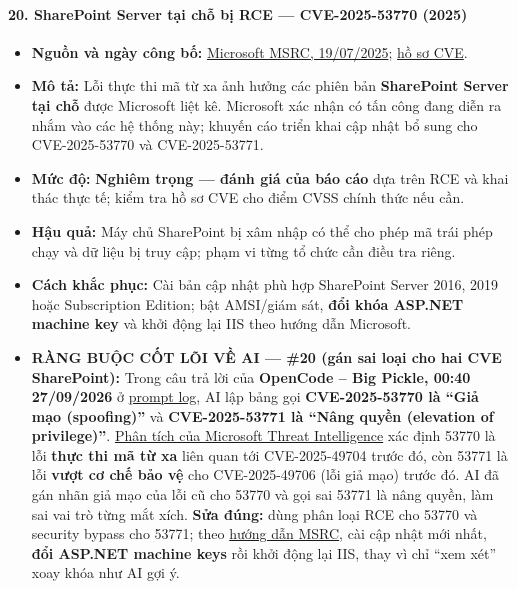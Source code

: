 \paragraph{20. SharePoint Server tại chỗ bị RCE --- CVE-2025-53770 (2025)}\label{sharepoint-server-tux1ea1i-chux1ed7-bux1ecb-rce-cve-2025-53770-2025}

\begin{itemize}
\tightlist
\item
  \textbf{Nguồn và ngày công bố:} \href{https://www.microsoft.com/en-us/msrc/blog/2025/07/customer-guidance-for-sharepoint-vulnerability-cve-2025-53770}{Microsoft MSRC, 19/07/2025}; \href{https://msrc.microsoft.com/update-guide/vulnerability/CVE-2025-53770}{hồ sơ CVE}.
\item
  \textbf{Mô tả:} Lỗi thực thi mã từ xa ảnh hưởng các phiên bản \textbf{SharePoint Server tại chỗ} được Microsoft liệt kê. Microsoft xác nhận có tấn công đang diễn ra nhắm vào các hệ thống này; khuyến cáo triển khai cập nhật bổ sung cho CVE-2025-53770 và CVE-2025-53771.
\item
  \textbf{Mức độ:} \textbf{Nghiêm trọng --- đánh giá của báo cáo} dựa trên RCE và khai thác thực tế; kiểm tra hồ sơ CVE cho điểm CVSS chính thức nếu cần.
\item
  \textbf{Hậu quả:} Máy chủ SharePoint bị xâm nhập có thể cho phép mã trái phép chạy và dữ liệu bị truy cập; phạm vi từng tổ chức cần điều tra riêng.
\item
  \textbf{Cách khắc phục:} Cài bản cập nhật phù hợp SharePoint Server 2016, 2019 hoặc Subscription Edition; bật AMSI/giám sát, \textbf{đổi khóa ASP.NET machine key} và khởi động lại IIS theo hướng dẫn Microsoft.
\item
  \textbf{RÀNG BUỘC CỐT LÕI VỀ AI --- \#20 (gán sai loại cho hai CVE SharePoint):} Trong câu trả lời của \textbf{OpenCode -- Big Pickle, 00:40 27/09/2026} ở \href{Appendix_A_Prompt_Log.md}{prompt log}, AI lập bảng gọi \textbf{CVE-2025-53770 là ``Giả mạo (spoofing)''} và \textbf{CVE-2025-53771 là ``Nâng quyền (elevation of privilege)''}. \href{https://www.microsoft.com/en-us/security/blog/2025/07/22/disrupting-active-exploitation-of-on-premises-sharepoint-vulnerabilities/}{Phân tích của Microsoft Threat Intelligence} xác định 53770 là lỗi \textbf{thực thi mã từ xa} liên quan tới CVE-2025-49704 trước đó, còn 53771 là lỗi \textbf{vượt cơ chế bảo vệ} cho CVE-2025-49706 (lỗi giả mạo) trước đó. AI đã gán nhãn giả mạo của lỗi cũ cho 53770 và gọi sai 53771 là nâng quyền, làm sai vai trò từng mắt xích. \textbf{Sửa đúng:} dùng phân loại RCE cho 53770 và security bypass cho 53771; theo \href{https://www.microsoft.com/en-us/msrc/blog/2025/07/customer-guidance-for-sharepoint-vulnerability-cve-2025-53770}{hướng dẫn MSRC}, cài cập nhật mới nhất, \textbf{đổi ASP.NET machine keys} rồi khởi động lại IIS, thay vì chỉ ``xem xét'' xoay khóa như AI gợi ý.
\end{itemize}

